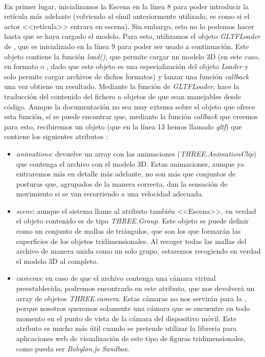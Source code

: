 \documentclass{subfiles}
\begin{document}
        \paragraph{}
        En primer lugar, inicializamos la Escena en la línea 8 para poder introducir la retícula más adelante (volviendo al símil anteriormente utilizado, es como si el actor <<retícula>> entrara en escena). Sin embargo, esto no lo podemos hacer hasta que se haya cargado el modelo. Para esto, utilizamos el objeto \textit{GLTFLoader} de \threejs \cite{web:threejs_gltfloader}, que es inicializado en la línea 9 para poder ser usado a continuación. Este objeto contiene la función \textit{load()}, que permite cargar un modelo 3D (en este caso, en formato \gltf o \glb, dado que este objeto es una especialización del objeto \textit{Loader} y solo permite cargar archivos de dichos formatos) y lanzar una función \textit{callback} una vez obtiene un resultado. Mediante la función de \textit{GLTFLoader}, \threejs hace la traducción del contenido del fichero a objetos de \threejs que sean manejables desde código. Aunque la documentación no sea muy extensa sobre el objeto que ofrece esta función, sí se puede encontrar que, mediante la función \textit{callback} que creemos para esto, recibiremos un objeto (que en la línea 13 hemos llamado \textit{gltf}) que contiene los siguientes atributos \cite{web:discoverthreejs}:

        \begin{itemize}
            \item \textit{animations}: devuelve un array con las animaciones (\textit{THREE.AnimationClip}) que contenga el archivo con el modelo 3D. Estas animaciones, aunque ya entraremos más en detalle más adelante, no son más que conjuntos de posturas que, agrupados de la manera correcta, dan la sensación de movimiento si se van recorriendo a una velocidad adecuada.
            \item \textit{scene}: aunque el sistema llame al atributo también <<Escena>>, en verdad el objeto contenido es de tipo \textit{THREE.Group}. Este objeto se puede definir como un conjunto de mallas de triángulos, que son los que formarán las superficies de los objetos tridimensionales. Al recoger todas las mallas del archivo de manera unida como un solo grupo, estaremos recogiendo en verdad el modelo 3D al completo.
            \item \textit{cameras}: en caso de que el archivo contenga una cámara virtual preestablecida, podremos encontrarlo en este atributo, que nos devolverá un array de objetos \textit{THREE.camera}. Estas cámaras no nos servirán para la \ra, porque nosotros queremos solamente una cámara que se encuentre en todo momento en el punto de vista de la cámara del dispositivo móvil. Este atributo es mucho más útil cuando se pretende utilizar la librería para aplicaciones web de visualización de este tipo de figuras tridimensionales, como pueda ser \textit{Babylon.js Sandbox}.
        \end{itemize}
\end{document}
